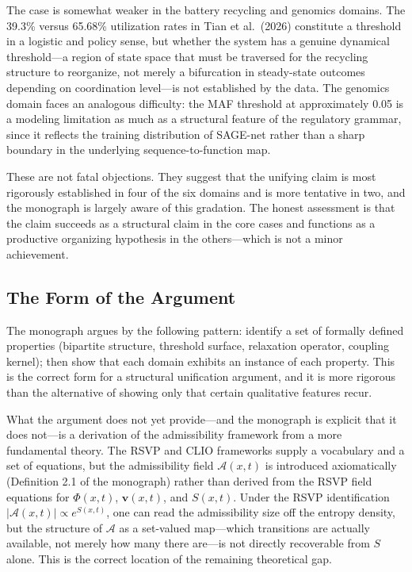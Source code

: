 \documentclass[12pt, a4paper]{article}
\theoremstyle{definition}
\begin{document}
The case is somewhat weaker in the battery recycling and genomics domains. The 39.3\% versus 65.68\% utilization rates in Tian et al.\ (2026) constitute a threshold in a logistic and policy sense, but whether the system has a genuine dynamical threshold---a region of state space that must be traversed for the recycling structure to reorganize, not merely a bifurcation in steady-state outcomes depending on coordination level---is not established by the data. The genomics domain faces an analogous difficulty: the MAF threshold at approximately 0.05 is a modeling limitation as much as a structural feature of the regulatory grammar, since it reflects the training distribution of SAGE-net rather than a sharp boundary in the underlying sequence-to-function map.

These are not fatal objections. They suggest that the unifying claim is most rigorously established in four of the six domains and is more tentative in two, and the monograph is largely aware of this gradation. The honest assessment is that the claim succeeds as a structural claim in the core cases and functions as a productive organizing hypothesis in the others---which is not a minor achievement.

\subsection{The Form of the Argument}

The monograph argues by the following pattern: identify a set of formally defined properties (bipartite structure, threshold surface, relaxation operator, coupling kernel); then show that each domain exhibits an instance of each property. This is the correct form for a structural unification argument, and it is more rigorous than the alternative of showing only that certain qualitative features recur.

What the argument does not yet provide---and the monograph is explicit that it does not---is a derivation of the admissibility framework from a more fundamental theory. The RSVP and CLIO frameworks supply a vocabulary and a set of equations, but the admissibility field $\mathcal{A}(x,t)$ is introduced axiomatically (Definition 2.1 of the monograph) rather than derived from the RSVP field equations for $\Phi(x,t)$, $\mathbf{v}(x,t)$, and $S(x,t)$. Under the RSVP identification $|\mathcal{A}(x,t)| \propto e^{S(x,t)}$, one can read the admissibility size off the entropy density, but the structure of $\mathcal{A}$ as a set-valued map---which transitions are actually available, not merely how many there are---is not directly recoverable from $S$ alone. This is the correct location of the remaining theoretical gap.
\end{document}
